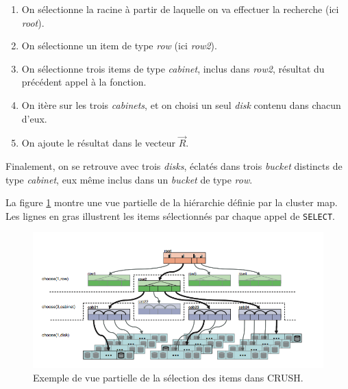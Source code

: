 \begin{enumerate}
\item On sélectionne la racine à partir de laquelle on va effectuer la recherche (ici \textit{root}).
\item On sélectionne un item de type \textit{row} (ici \textit{row2}).
\item On sélectionne trois items de type \textit{cabinet}, inclus dans \textit{row2}, résultat du précédent appel à la fonction.
\item On itère sur les trois \textit{cabinets}, et on choisi un seul \textit{disk} contenu dans chacun d'eux.
\item On ajoute le résultat dans le vecteur $\vec{R}$.
\end{enumerate}

Finalement, on se retrouve avec trois \textit{disks}, éclatés dans trois \textit{bucket} distincts de type \textit{cabinet}, eux même inclus dans un \textit{bucket} de type \textit{row}.

La figure \ref{chap3:CRUSH_execution} montre une vue partielle de la hiérarchie définie par la cluster map. Les lignes en gras illustrent les items sélectionnés par chaque appel de \verb|SELECT|.

\begin{figure}[h]
    \centering
    \includegraphics[scale=0.5]{./images/CRUSH_execution.png}
    \caption{Exemple de vue partielle de la sélection des items dans CRUSH.}
    \label{chap3:CRUSH_execution}
\end{figure}